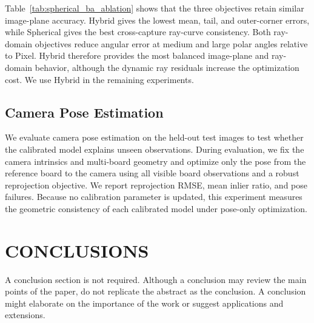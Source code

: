 \documentclass[letterpaper, 10 pt, conference]{ieeeconf}  %
\begin{document}


Table~\ref{tab:spherical_ba_ablation} shows that the three objectives retain
similar image-plane accuracy. Hybrid gives the lowest mean, tail, and
outer-corner errors, while Spherical gives the best cross-capture ray-curve
consistency. Both ray-domain objectives reduce angular error at medium and
large polar angles relative to Pixel. Hybrid therefore provides the most
balanced image-plane and ray-domain behavior, although the dynamic ray
residuals increase the optimization cost. We use Hybrid in the remaining
experiments.

\subsection{Camera Pose Estimation}

We evaluate camera pose estimation on the held-out test images to test whether
the calibrated model explains unseen observations. During evaluation, we fix
the camera intrinsics and multi-board geometry and optimize only the pose from
the reference board to the camera using all visible board observations and a
robust reprojection objective. We report reprojection RMSE, mean inlier ratio,
and pose failures. Because no calibration parameter is updated, this
experiment measures the geometric consistency of each calibrated model under
pose-only optimization.

\section{CONCLUSIONS}

A conclusion section is not required. Although a conclusion may review the main points of the paper, do not replicate the abstract as the conclusion. A conclusion might elaborate on the importance of the work or suggest applications and extensions. 

\addtolength{\textheight}{-12cm}   %

\end{document}

